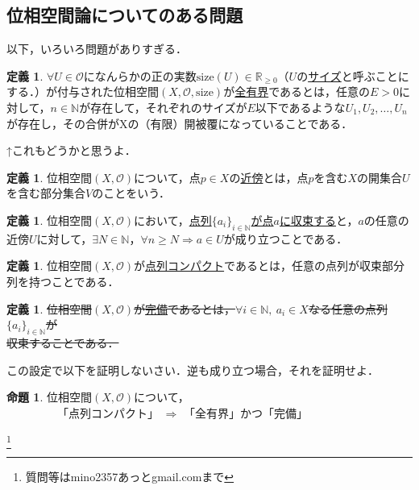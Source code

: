 \documentclass[dvipdfmx,12pt]{jsarticle}
\theoremstyle{definition}
\newtheorem*{theorem*}{命題}
\newtheorem{definition}[theorem]{定義}
\begin{document}
\subsection*{位相空間論についてのある問題}
以下，いろいろ問題がありすぎる．

\begin{definition}
$\forall U \in \mathcal{O}$になんらかの正の実数$\mathrm{size}(U) \in \mathbb{R}_{\ge 0}$（$U$の\underline{サイズ}と呼ぶことにする．）が付与された位相空間$(X, \mathcal{O}, \mathrm{size})$が\underline{全有界}であるとは，任意の$E>0$に対して，$n \in \mathbb{N}$が存在して，それぞれのサイズが$E$以下であるような$U_{1}, U_{2}, \ldots ,U_{n}$が存在し，その合併がXの（有限）開被覆になっていることである．
\end{definition}

↑これもどうかと思うよ．

\begin{definition}
位相空間$(X, \mathcal{O})$について，点$p \in X$の\underline{近傍}とは，点$p$を含む$X$の開集合$U$を含む部分集合$V$のことをいう．
\end{definition}

\begin{definition}
位相空間$(X,\mathcal{O})$において，\underline{点列$\{ a_{i} \}_{i \in \mathbb{N}}$が点$a$に収束する}と，$a$の任意の近傍$U$に対して，$\exists N \in \mathbb{N}$，$\forall n \ge N \Longrightarrow a \in U$が成り立つことである．
\end{definition}

\begin{definition}
位相空間$(X,\mathcal{O})$が\underline{点列コンパクト}であるとは，任意の点列が収束部分列を持つことである．
\end{definition}

\begin{definition}
\sout{位相空間$(X,\mathcal{O})$が\underline{完備}であるとは，$\forall i\in \mathbb{N},\ a_{i} \in X$なる任意の点列$\{ a_{i} \}_{i \in \mathbb{N}}$が}\\
\sout{収束することである．}
\end{definition}

この設定で以下を証明しないさい．逆も成り立つ場合，それを証明せよ．

\begin{theorem*}
位相空間$(X, \mathcal{O})$について， \\
\ \ \ \ \ \ \ \ \ 「点列コンパクト」 $\Longrightarrow$ 「全有界」かつ「完備」
\end{theorem*}



\footnote[0]{
質問等はmino2357あっとgmail.comまで
}

\thispagestyle{empty}
\end{document}

